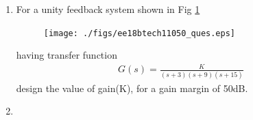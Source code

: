 \begin{enumerate}[label=\thesection.\arabic*.,ref=\thesection.\theenumi]
\item For a unity feedback system shown in Fig \ref{fig:ee18btech11050_fig1}
\begin{figure}[!ht]
\centering
\texttt{[image: ./figs/ee18btech11050\_ques.eps]}
\caption{}
\label{fig:ee18btech11050_fig1}
\end{figure}
having transfer function
\begin{align}
    G(s) = \frac{K}{(s+3)(s+9)(s+15)}
    \label{eq:ee18btech11050_1}
\end{align}
design the value of gain(K), for a gain margin of 50dB.

\item \solution


\end{enumerate}
